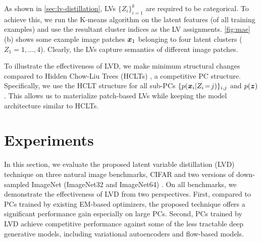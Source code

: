 \documentclass{article} %
\begin{document}
As shown in \cref{sec:lv-distillation}, LVs $\{Z_i\}_{i=1}^{k}$ are required to be categorical. To achieve this, we run the K-means algorithm on the latent features (of all training examples) and use the resultant cluster indices as the LV assignments. \cref{fig:mae}(b) shows some example image patches $\boldsymbol{x}_1$ belonging to four latent clusters (\ie $Z_1 = 1, \dots, 4$). Clearly, the LVs capture semantics of different image patches.

To illustrate the effectiveness of LVD, we make minimum structural changes compared to Hidden Chow-Liu Trees (HCLTs) \citep{liu2021tractable}, a competitive PC structure. Specifically, we use the HCLT structure for all sub-PCs $\{{p}(\boldsymbol{x}_i \vert Z_i \!=\! j)\}_{i,j}$ and ${p}(\boldsymbol{z})$. This allows us to materialize patch-based LVs while keeping the model architecture similar to HCLTs.

\section{Experiments}
\label{sec:exp}

In this section, we evaluate the proposed latent variable distillation (LVD) technique on three natural image benchmarks, \ie CIFAR \citep{krizhevsky2009learning} and two versions of down-sampled ImageNet (ImageNet32 and ImageNet64) \citep{deng2009imagenet}. On all benchmarks, we demonstrate the effectiveness of LVD from two perspectives. First, compared to PCs trained by existing EM-based optimizers, the proposed technique offers a significant performance gain especially on large PCs. Second, PCs trained by LVD achieve competitive performance against some of the less tractable deep generative models, including variational autoencoders and flow-based models.

\begin{table}[t]
\caption{Density estimation performance of Tractable Probabilistic Models (TPMs) and Deep Generative Models (DGMs) on three natural image datasets. Reported numbers are test set bit-per-dimension (bpd). Bold indicates best bpd (smaller is better) among all four TPMs.}
\label{tab:img-main-results}
\centering
{}
\vspace{-1.0em}
\end{table}
\end{document}
